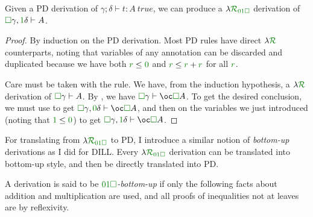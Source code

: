 \begin{proposition}[PD $\to$ \name]
  Given a PD derivation of $\gamma; \delta \vdash t : A~\mathit{true}$, we can
  produce a $\name_{\instPD}$ derivation of
  $\valid\gamma, \true\delta \vdash A$.
\end{proposition}
\begin{proof}
  By induction on the PD derivation.
  Most PD rules have direct $\name$ counterparts, noting that variables of any
  annotation can be discarded and duplicated because we have both
  $\gr r \leq \gr 0$ and
  $\gr r \leq \gr r + \gr r$ for all
  $\gr r$.

  Care must be taken with the  rule.
  We have, from the induction hypothesis, a $\name$ derivation of
  $\gr\Box\gamma \vdash A$.
  By , we have
  $\gr\Box\gamma \vdash \oc\valid A$.
  To get the desired conclusion, we must use  to get
  $\gr\Box\gamma, \gr\unused\delta \vdash \oc\valid A$, and
  then  on the variables we just introduced (noting that
  $\true \leq \unused$) to get
  $\gr\Box\gamma, \gr\true\delta \vdash \oc\valid A$.
\end{proof}

For translating from $\name_{\instPD}$ to PD, I introduce a similar notion of
\emph{bottom-up} derivations as I did for DILL\@.
Every $\name_{\instPD}$ derivation can be translated into bottom-up style, and
then be directly translated into PD\@.

\begin{definition}\label{def:PD-bottom-up}
  A derivation is said to be \emph{$\instPD$-bottom-up} if only the following
  facts about addition and multiplication are used, and all proofs of
  inequalities not at leaves are by reflexivity.

\end{definition}


